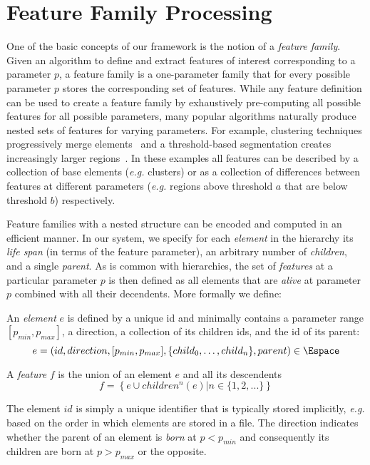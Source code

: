 \section{Feature Family Processing} 
\label{sec:featureFamilyProcessing}
One of the basic concepts of our framework is the notion of a {\it feature
  family}. Given an algorithm to define and extract features of
interest corresponding to a parameter $p$, a feature family is a one-parameter
family that for every possible parameter $p$ stores the corresponding set of
features.
While any feature definition can be used to create a feature family
by exhaustively pre-computing all possible features for all possible parameters,
many popular algorithms naturally produce nested sets of
features for varying parameters. For example, clustering techniques progressively
merge elements~\cite{Sheikh07,Comaniciu02} and a threshold-based segmentation creates
increasingly larger regions~\cite{Bremer10tvcg}. In these examples all features can
be described by a collection of base elements ({\it e.g.} clusters) or as a
collection of differences between features at different parameters ({\it e.g.} regions
above threshold $a$ that are below threshold $b$) respectively. 

Feature families with a nested structure can be encoded and computed in an
efficient manner. In our system, we specify for each {\it element} in the
hierarchy its {\it life span} (in terms of the feature parameter), an arbitrary
number of {\it children}, and a single {\it parent}. As is common with
hierarchies, the set of {\it features} at a particular parameter $p$ is then
defined as all elements that are {\it alive} at parameter $p$ combined with all
their decendents. More formally we define:

\begin{definition}[Element]
  An \emph{element} $e$ is defined by a unique id and minimally contains a
  parameter range $[p_{min},p_{max}]$, a direction, a collection of its children ids, and
  the id of its parent:
 $$e = \left(id,direction,[p_{min},p_{max}],\{child_0,\ldots ,child_n\},parent\right ) \in \Espace$$
\end{definition}

\begin{definition}[Feature]
  A \emph{feature} $f$ is the union of an element $e$ and all its descendents
$$f = \left\{e \cup children^n(e) | n \in \{1,2,...\}\right\}$$
\end{definition}

\noindent
The element $id$ is simply a unique identifier that is typically stored implicitly,
{\it e.g.} based on the order in which elements are stored in a file. The
direction indicates whether the parent of an element is {\it born} at
$p<p_{min}$ and consequently its children are born at $p > p_{max}$ or the
opposite. 

